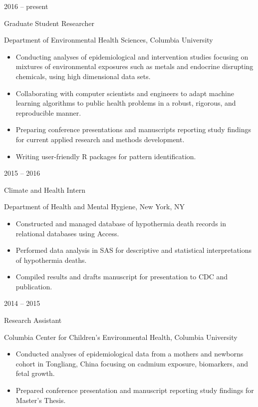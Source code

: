 \documentclass[a4paper,10pt]{article}
\newlength{\cvcolumngapwidth}
\newlength{\cvleftcolumnwidth}
\newlength{\cvrightcolumnwidth}
\newcommand{\cvtitlestyle}[1]{{\large\cvtitlefont\textcolor{cvtitlecolor}{#1}}}
\newcommand{\cvdurationstyle}[1]{{\small\cvdurationfont\textcolor{cvdurationcolor}{#1}}}
\newlength{\cvafteritemskipamount}
\newlength{\cvaftertitleskipamount}
\newlength{\cvparskip}
\newcommand{\cvitem}[2]{
    \begin{minipage}[t]{\cvleftcolumnwidth}
        \raggedleft #1
    \end{minipage}%
    \hspace{\cvcolumngapwidth}%
    \begin{minipage}[t]{\cvrightcolumnwidth}
        \setlength{\parskip}{\cvparskip} #2
    \end{minipage}

    \vspace{\cvafteritemskipamount}
}
\newcommand{\cvtitle}[1]{
    \cvtitlestyle{#1}

    \vspace{\cvaftertitleskipamount}
    \vspace{-\cvparskip}
}
\begin{document}
\cvitem{
    \cvdurationstyle{2016 -- present}
}{
    \cvtitle{Graduate Student Researcher}

    Department of Environmental Health Sciences, Columbia University

    \begin{itemize}[leftmargin=*]
        \item Conducting analyses of epidemiological and intervention studies focusing on mixtures of environmental exposures such as metals and endocrine disrupting chemicals, using high dimensional data sets.
        \item Collaborating with computer scientists and engineers to adapt machine learning algorithms to public health problems in a robust, rigorous, and reproducible manner.
        \item Preparing conference presentations and manuscripts reporting study findings for current applied research and methods development.
        \item Writing user-friendly R packages for pattern identification.
    \end{itemize}
}

\cvitem{
    \cvdurationstyle{2015 -- 2016}
}{
    \cvtitle{Climate and Health Intern}

    Department of Health and Mental Hygiene, New York, NY

    \begin{itemize}[leftmargin=*]
        \item Constructed and managed database of hypothermia death records in relational databases using Access.	\item Performed data analysis in SAS for descriptive and statistical interpretations of hypothermia deaths.
        \item Compiled results and drafts manuscript for presentation to CDC and publication.
    \end{itemize}
}

\cvitem{
    \cvdurationstyle{2014 -- 2015}
}{
    \cvtitle{Research Assistant}

    Columbia Center for Children's Environmental Health, Columbia University

    \begin{itemize}[leftmargin=*]
        \item Conducted analyses of epidemiological data from a mothers and newborns cohort in Tongliang, China focusing on cadmium exposure, biomarkers, and fetal growth.
 	\item Prepared conference presentation and manuscript reporting study findings for Master’s Thesis.
    \end{itemize}
}
\end{document}
